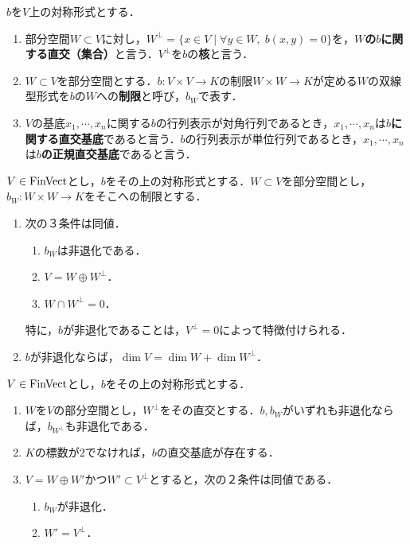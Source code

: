 \documentclass[uplatex,dvipdfmx]{jsreport}
\begin{document}
\begin{definition}
    $b$を$V$上の対称形式とする．
    \begin{enumerate}
        \item 部分空間$W\subset V$に対し，$W^\perp = \{ x\in V\mid \forall y\in W,\;b(x,y)=0 \}$を，\textbf{$W$の$b$に関する直交（集合）}と言う．$V^\perp$を$b$の\textbf{核}と言う．
        \item $W\subset V$を部分空間とする．$b:V\times V\to K$の制限$W\times W\to K$が定める$W$の双線型形式を$b$の$W$への\textbf{制限}と呼び，$b_W$で表す．
        \item $V$の基底$x_1,\cdots,x_n$に関する$b$の行列表示が対角行列であるとき，$x_1,\cdots,x_n$は\textbf{$b$に関する直交基底}であると言う．$b$の行列表示が単位行列であるとき，$x_1,\cdots,x_n$は\textbf{$b$の正規直交基底}であると言う．
    \end{enumerate}
\end{definition}

\begin{proposition}[空間の直交に沿った分解]\label{prop-decomposition-along-orthogonal-space}
    $V\in\mathrm{FinVect}$とし，$b$をその上の対称形式とする．$W\subset V$を部分空間とし，$b_W:W\times W\to K$をそこへの制限とする．
    \begin{enumerate}
        \item 次の３条件は同値．
        \begin{enumerate}[(1)]
            \item $b_W$は非退化である．
            \item $V=W\oplus W^\perp$．
            \item $W\cap W^\perp=0$．
        \end{enumerate}
        特に，$b$が非退化であることは，$V^\perp=0$によって特徴付けられる．
        \item $b$が非退化ならば，$\dim V=\dim W+\dim W^\perp$．
    \end{enumerate}
\end{proposition}

\begin{corollary}\label{cor-existence-of-orthogonal-basis}
    $V\in\mathrm{FinVect}$とし，$b$をその上の対称形式とする．
    \begin{enumerate}
        \item $W$を$V$の部分空間とし，$W^\perp$をその直交とする．$b,b_W$がいずれも非退化ならば，$b_{W^\perp}$も非退化である．
        \item $K$の標数が$2$でなければ，$b$の直交基底が存在する．
        \item $V=W\oplus W'$かつ$W'\subset V^\perp$とすると，次の２条件は同値である．
        \begin{enumerate}[(1)]
            \item $b_W$が非退化．
            \item $W'=V^\perp$．
        \end{enumerate}
    \end{enumerate}
\end{corollary}
\end{document}
